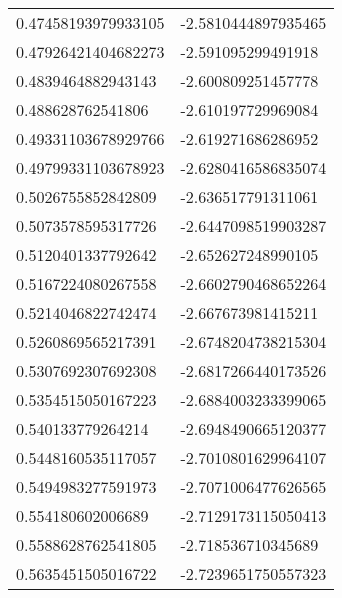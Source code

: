 \begin{supertabular}{ll}
0.47458193979933105 & -2.5810444897935465  \\
0.47926421404682273 & -2.591095299491918   \\
0.4839464882943143  & -2.600809251457778   \\
0.488628762541806   & -2.610197729969084   \\
0.49331103678929766 & -2.619271686286952   \\
0.49799331103678923 & -2.6280416586835074  \\
0.5026755852842809  & -2.636517791311061   \\
0.5073578595317726  & -2.6447098519903287  \\
0.5120401337792642  & -2.652627248990105   \\
0.5167224080267558  & -2.6602790468652264  \\
0.5214046822742474  & -2.667673981415211   \\
0.5260869565217391  & -2.6748204738215304  \\
0.5307692307692308  & -2.6817266440173526  \\
0.5354515050167223  & -2.6884003233399065  \\
0.540133779264214   & -2.6948490665120377  \\
0.5448160535117057  & -2.7010801629964107  \\
0.5494983277591973  & -2.7071006477626565  \\
0.554180602006689   & -2.7129173115050413  \\
0.5588628762541805  & -2.718536710345689   \\
0.5635451505016722  & -2.7239651750557323  \\
\end{supertabular}
